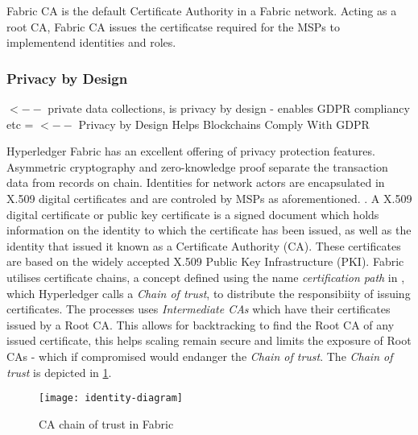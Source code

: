 Fabric CA is the default Certificate Authority in a Fabric network. Acting as a root CA, Fabric CA issues the certificatse required for the MSPs to implementend identities and roles. \cite{noauthor_identity_nodate}


\subsubsection{Privacy by Design}

\cite{noauthor_private_nodate} $<--$ private data collections, is privacy by design - enables GDPR compliancy etc = \cite{narumanchi_privacy_2019} $<--$ Privacy by Design Helps Blockchains Comply With GDPR

Hyperledger Fabric has an excellent offering of privacy protection features.
Asymmetric cryptography and zero-knowledge proof separate the transaction data from records on chain. 
Identities for network actors are encapsulated in X.509 digital certificates and are controled by MSPs as aforementioned. \cite{noauthor_identity_nodate}. 
A X.509 digital certificate or public key certificate is a signed document which holds information on the identity to which the certificate has been issued, as well as the identity that issued it known as a Certificate Authority (CA). 
These certificates are based on the widely accepted X.509 Public Key Infrastructure (PKI). \cite{cooper_internet_nodate}
Fabric utilises certificate chains, a concept defined using the name \emph{certification path} in \cite{cooper_internet_nodate}, which Hyperledger calls a \emph{Chain of trust}, to distribute the responsibiity of issuing certificates. 
The processes uses \emph{Intermediate CAs} which have their certificates issued by a Root CA. 
This allows for backtracking to find the Root CA of any issued certificate, this helps scaling remain secure and limits the exposure of Root CAs - which if compromised would endanger the \emph{Chain of trust}. \cite{noauthor_identity_nodate}
The \emph{Chain of trust} is depicted in \ref{fig:trustchain}.
\begin{figure}[H]
  \texttt{[image: identity-diagram]}
  \caption{CA chain of trust in Fabric}
  \label{fig:trustchain}
\end{figure}

